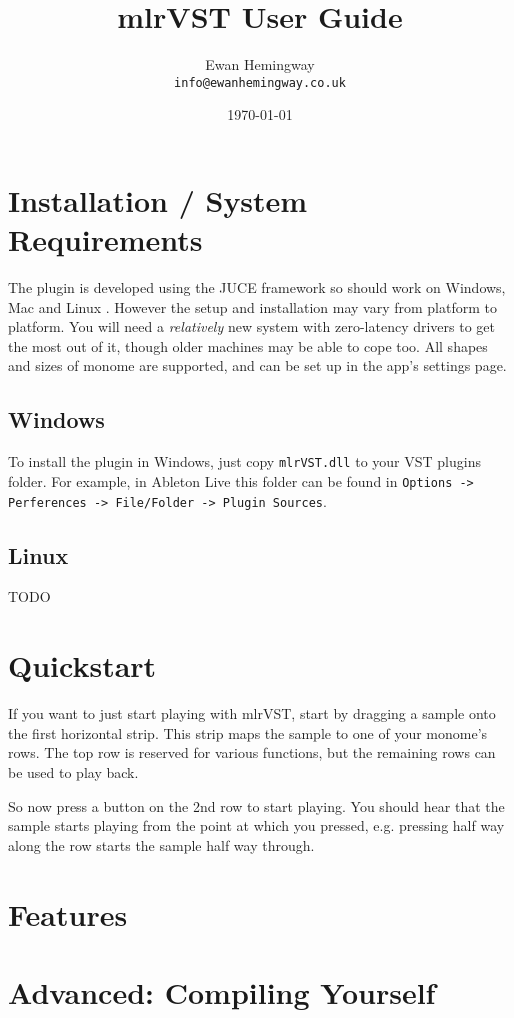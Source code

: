 \documentclass[10pt,a4paper]{article}
\begin{document}
\title{mlrVST User Guide}
\author{Ewan Hemingway\\
  \texttt{info@ewanhemingway.co.uk}}
\date{\today}
\maketitle


\tableofcontents
\newpage

\section{Installation / System Requirements}

The plugin is developed using the JUCE framework so should work on Windows, Mac and Linux . However the setup and installation may vary from platform to platform. You will need a \textit{relatively} new system with zero-latency drivers to get the most out of it, though older machines may be able to cope too. All shapes and sizes of monome are supported, and can be set up in the app's settings page.

\subsection{Windows}

To install the plugin in Windows, just copy \texttt{mlrVST.dll} to your VST plugins folder. For example, in Ableton Live this folder can be found in \texttt{Options -> Perferences -> File/Folder -> Plugin Sources}.

\subsection{Linux}
TODO

\section{Quickstart}

If you want to just start playing with mlrVST, start by dragging a sample onto the first horizontal strip. This strip maps the sample to one of your monome's rows. The top row is reserved for various functions, but the remaining rows can be used to play back.

So now press a button on the 2nd row to start playing. You should hear that the sample starts playing from the point at which you pressed, e.g. pressing half way along the row starts the sample half way through.

\section{Features}

\section{Advanced: Compiling Yourself}
\end{document}
